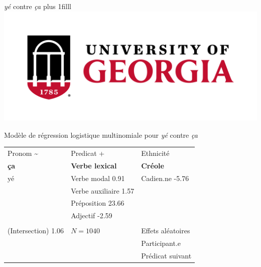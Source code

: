 \documentclass{beamer}\usepackage[]{graphicx}\usepackage[]{xcolor}
\newcommand{\Logo}{{\hskip0pt plus 1filll \includegraphics[scale=0.028]{uga_logo.png}}}
\newcommand{\lexi}[1]{\textit{#1}}
\begin{document}
\begin{frame}{\lexi{yé} contre \lexi{ça}\Logo}
\footnotesize
  \begin{center}
    Modèle de régression logistique multinomiale pour \lexi{yé} contre \lexi{ça}

    \begin{tabular}{p{3cm} p{3cm} p{3cm}}
                                                                                                       &                                                                                                    & \\
      \hline
      Pronom \hfill \~{}                                                                               & Predicat \hfill +                                                                                  & Ethnicité \\
      \hline
      \textbf{ça}                                                                                      & \textbf{Verbe lexical}                                                                             & \textbf{Créole} \\
      yé                                                                                               & Verbe modal \hfill 0.91                & Cadien.ne \hfill -5.76 \\
                                                                                                       & Verbe auxiliaire \hfill 1.57       & \\
                                                                                                       & Préposition \hfill 23.66          & \\
                                                                                                       & Adjectif \hfill -2.59               & \\
                                                                                                       & & \\
      \hline
      (Intersection) \hfill 1.06             & $N = 1040$                                               & Effets aléatoires \\
      \hline
                                                                                                       &                                                                                                    & Participant.e \\
                                                                                                       &                                                                                                    & Prédicat suivant \\
    \end{tabular}
  \end{center}
\end{frame}
  
\end{document}
